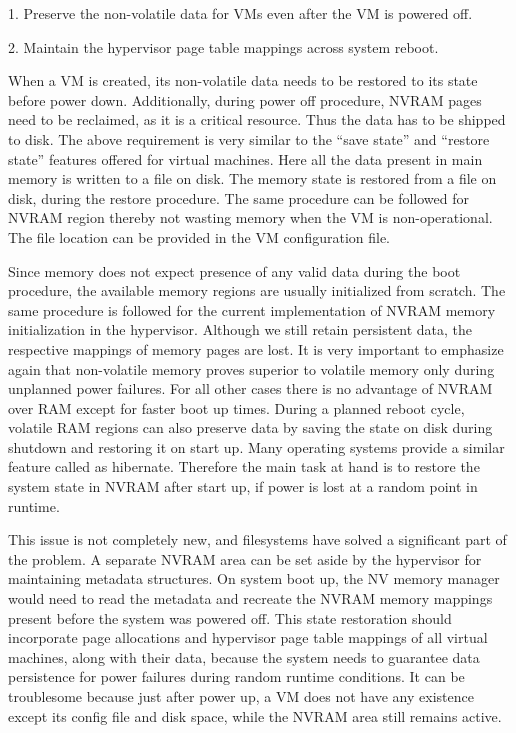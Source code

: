 1. Preserve the non-volatile data for VMs even after the VM is powered off. 

2. Maintain the hypervisor page table mappings across system reboot. 

When a VM is created, its non-volatile data needs to be restored to its state before power down. Additionally, during power off procedure, NVRAM pages need to be reclaimed, as it is a critical resource. Thus the data has to be shipped to disk. The above requirement is very similar to the “save state” and “restore state” features offered for virtual machines. Here all the data present in main memory is written to a file on disk. The memory state is restored from a file on disk, during the restore procedure. The same procedure can be followed for NVRAM region thereby not wasting memory when the VM is non-operational. The file location can be provided in the VM configuration file. 

Since memory does not expect presence of any valid data during the boot procedure, the available memory regions are usually initialized from scratch. The same procedure is followed for the current implementation of NVRAM memory initialization in the hypervisor. Although we still retain persistent data, the respective mappings of memory pages are lost. It is very important to emphasize again that non-volatile memory proves superior to volatile memory only during unplanned power failures. For all other cases there is no advantage of NVRAM over RAM except for faster boot up times. During a planned reboot cycle, volatile RAM regions can also preserve data by saving the state on disk during shutdown and restoring it on start up. Many operating systems provide a similar feature called as hibernate. Therefore the main task at hand is to restore the system state in NVRAM after start up, if power is lost at a random point in runtime. 

This issue is not completely new, and filesystems have solved a significant part of the problem. A separate NVRAM area can be set aside by the hypervisor for maintaining metadata structures. On system boot up, the NV memory manager would need to read the metadata and recreate the NVRAM memory mappings present before the system was powered off. This state restoration should incorporate page allocations and hypervisor page table mappings of all virtual machines, along with their data, because the system needs to guarantee data persistence for power failures during random runtime conditions. It can be troublesome because just after power up, a VM does not have any existence except its config file and disk space, while the NVRAM area still remains active.  

